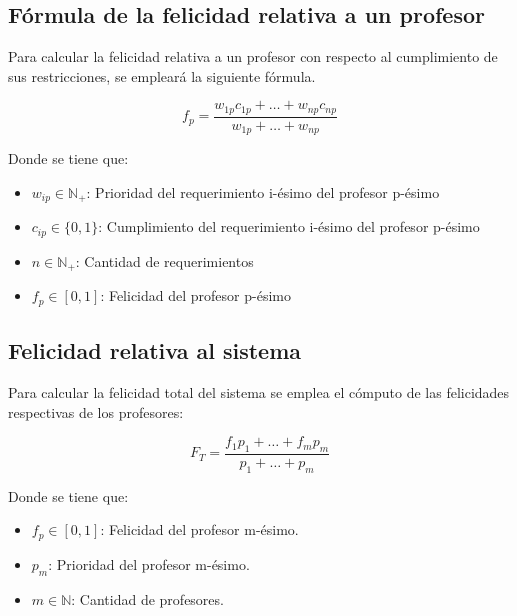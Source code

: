 \subsection{Fórmula de la felicidad relativa a un profesor}
Para calcular la felicidad relativa a un profesor con respecto al cumplimiento de sus restricciones, se empleará la siguiente fórmula.

\begin{equation}
	f_p = \frac{w_{1p}c_{1p} + \dots + w_{np}c_{np} }{w_{1p} + \dots + w_{np}}
\end{equation}

\noindent Donde se tiene que: \\

\begin{itemize}
 	\item $w_{ip} \in \mathbb{N}_+ $: Prioridad del requerimiento i-ésimo del profesor p-ésimo
	\item $c_{ip} \in \{0, 1\}$: Cumplimiento del requerimiento i-ésimo del profesor p-ésimo
	\item $n \in \mathbb{N}_+$: Cantidad de requerimientos
	\item $f_p \in [0, 1]$: Felicidad del profesor p-ésimo
\end{itemize}

\subsection{Felicidad relativa al sistema}
Para calcular la felicidad total del sistema se emplea el cómputo de las felicidades respectivas de los profesores:

\begin{equation}
	F_T = \frac{f_1p_1 + \dots + f_mp_m}{p_1 + \dots + p_m}
\end{equation}

\noindent Donde se tiene que:
\begin{itemize}
	\item $f_p \in [0, 1]$: Felicidad del profesor m-ésimo.
	\item $p_m$: Prioridad del profesor m-ésimo.
	\item $m \in \mathbb{N}$: Cantidad de profesores.
\end{itemize}




